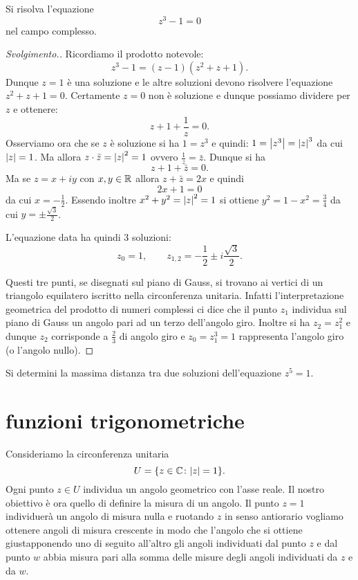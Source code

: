 \begin{exercise}
Si risolva l'equazione 
\[ 
 z^3 - 1 = 0
\]
nel campo complesso.
\end{exercise}
%
\begin{proof}[Svolgimento.]
Ricordiamo il prodotto notevole:
\[
  z^3 - 1 = (z-1)(z^2+z+1).
\]
Dunque $z=1$ è una soluzione e le altre soluzioni devono risolvere 
l'equazione $z^2+z+1=0$. 
Certamente $z=0$ non è soluzione e dunque possiamo dividere per $z$ 
e ottenere:
\[
  z + 1 + \frac 1 z = 0.
\]
Osserviamo ora che se $z$ è soluzione si ha $1=z^3$
e quindi: $1 = {\left|z^3\right|}= {\left|z\right|}^3$ da cui ${\left|z\right|} = 1$.
Ma allora $z\cdot \bar z = {\left|z\right|}^2 = 1$ ovvero $\frac 1 z = \bar z$.
Dunque si ha 
\[
    z + 1 + \bar z = 0.
\]
Ma se $z=x+iy$ con $x,y\in {\mathbb R}$ allora $z+\bar z = 2x$
e quindi 
\[
    2x + 1 = 0 
\]
da cui $x=-\frac 1 2$. Essendo inoltre $x^2+y^2={\left|z\right|}^2=1$ si ottiene
$y^2 = 1-x^2 = \frac 3 4$ da cui $y=\pm \frac{\sqrt 3}{2}$.

L'equazione data ha quindi $3$ soluzioni:
\[
z_0 = 1, \qquad 
z_{1,2} = -\frac 1 2 \pm i \frac{\sqrt 3} 2.
\]

Questi tre punti, se disegnati sul piano di Gauss, si trovano 
ai vertici di un triangolo equilatero iscritto nella circonferenza unitaria.
Infatti l'interpretazione geometrica del prodotto di numeri complessi ci dice 
che il punto $z_1$ individua sul piano di Gauss un angolo pari 
ad un terzo dell'angolo giro. Inoltre si ha $z_2 = z_1^2$ e dunque 
$z_2$ corrisponde a $\frac 2 3$ di angolo giro e $z_0=z_1^3 = 1$ rappresenta 
l'angolo giro (o l'angolo nullo).
\end{proof}

\begin{exercise}
Si determini la massima distanza tra due soluzioni 
dell'equazione $z^5=1$. 
\end{exercise}


\section{funzioni trigonometriche}
\label{sec:funzioni_trigonometriche}%
\label{sec:avvolgimento}%

Consideriamo la circonferenza unitaria 
\[
  U = {\left\{ z\in {\mathbb C}\colon {\left|z\right|} = 1 \right\}}.
\]
Ogni punto $z\in U$ individua un angolo geometrico con l'asse reale.
Il nostro obiettivo è ora quello di definire la misura di un angolo.
Il punto $z=1$ individuerà un angolo di misura nulla e 
ruotando $z$ in senso antiorario vogliamo ottenere angoli 
di misura crescente in modo che l'angolo che si ottiene 
giustapponendo uno di seguito all'altro gli angoli individuati 
dal punto $z$ e dal punto $w$ abbia misura pari alla somma delle misure 
degli angoli individuati da $z$ e da $w$.


